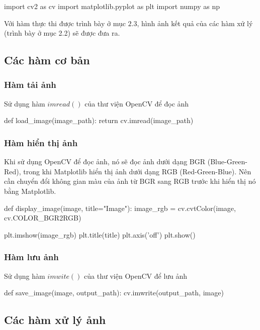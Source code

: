 \documentclass[a4paper]{article}
\begin{document}
\begin{python}
import cv2 as cv
import matplotlib.pyplot as plt
import numpy as np
\end{python}
Với hàm thực thi được trình bày ở mục $2.3$, hình ảnh kết quả của các hàm xử lý (trình bày ở mục 2.2) sẽ được đưa ra.
\subsection{Các hàm cơ bản}

\subsubsection{Hàm tải ảnh}
Sử dụng hàm $imread()$ của thư viện OpenCV để đọc ảnh

\begin{python}
def load_image(image_path):
    return cv.imread(image_path)
\end{python}

\subsubsection{Hàm hiển thị ảnh}
Khi sử dụng OpenCV để đọc ảnh, nó sẽ đọc ảnh dưới dạng BGR (Blue-Green-Red), trong khi Matplotlib hiển thị ảnh dưới dạng RGB (Red-Green-Blue). Nên cần chuyển đổi không gian màu của ảnh từ BGR sang RGB trước khi hiển thị nó bằng Matplotlib.
\begin{python}
def display_image(image, title="Image"):
    image_rgb = cv.cvtColor(image, cv.COLOR_BGR2RGB)
    
    plt.imshow(image_rgb)
    plt.title(title)
    plt.axis('off')
    plt.show()
\end{python}

\subsubsection{Hàm lưu ảnh}
Sử dụng hàm $imwite()$ của thư viện OpenCV để lưu ảnh

\begin{python}
def save_image(image, output_path):
    cv.imwrite(output_path, image)
\end{python}

\subsection{Các hàm xử lý ảnh}
\end{document}
